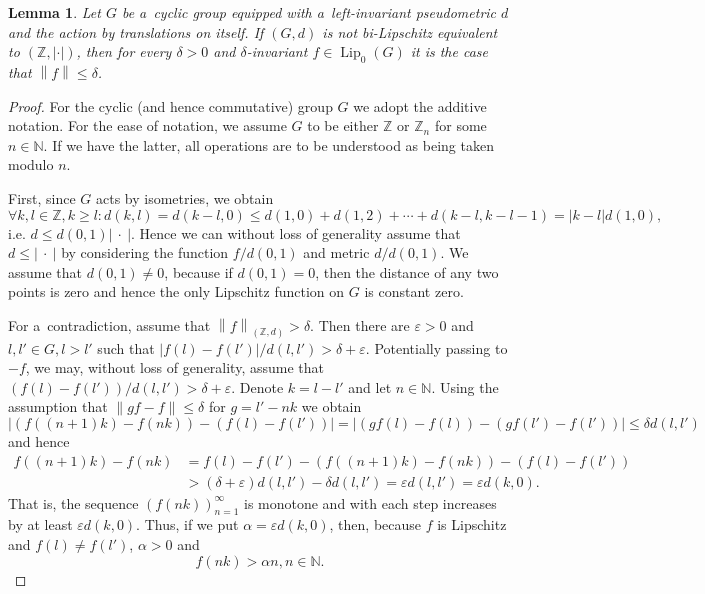 \documentclass[11pt,a4paper]{amsart}
\newtheorem{lemma}[theorem]{Lemma}
\theoremstyle{definition}
\newcommand{\Z}{\mathbb{Z}}
\newcommand{\N}{\mathbb{N}}
\newcommand{\eps}{\varepsilon}
\newcommand{\abs}[1]{\left| #1 \right|}
\newcommand{\norm}[1]{\left\| #1 \right\|}
\newcommand{\Lipz}{\operatorname{Lip}_0}
\newcommand{\absFunc}{\abs{\: \cdot \: }}
\begin{document}
	\begin{lemma} \label{lma:badZ}
		Let $G$ be a~cyclic group equipped with a~left-invariant pseudometric $d$ and the action by translations on itself. If $(G, d)$ is not bi-Lipschitz equivalent to $(\Z, \abs{\cdot})$, then for every $\delta > 0$ and $\delta$-invariant $f \in \Lipz(G)$ it is the case that $\norm{f} \leq \delta$.
	\end{lemma}
	\begin{proof}
		For the cyclic (and hence commutative) group $G$ we adopt the additive notation. For the ease of notation, we assume $G$ to be either $\Z$ or $\Z_n$ for some $n \in \N$. If we have the latter, all operations are to be understood as being taken modulo $n$.
		
		First, since $G$ acts by isometries, we obtain
		\begin{equation*}
			\forall k, l \in \Z, k \geq l \colon d(k, l) = d(k-l, 0) \leq d(1, 0) + d(1, 2) + \cdots + d(k-l, k-l-1) = \abs{k-l}d(1, 0),
		\end{equation*}
		i.e. $d \leq d(0,1)\absFunc$. Hence we can without loss of generality assume that $d \leq \absFunc$ by considering the function $f/d(0,1)$ and metric $d/d(0,1)$. We assume that $d(0, 1) \neq 0$, because if $d(0, 1) = 0$, then the distance of any two points is zero and hence the only Lipschitz function on $G$ is constant zero.
		
		For a~contradiction, assume that $\norm{f}_{(\Z, d)} > \delta$. Then there are $\eps > 0$ and $l, l' \in G, l > l'$ such that $\abs{f(l) - f(l')}/d(l, l') > \delta + \eps$. Potentially passing to $-f$, we may, without loss of generality, assume that $(f(l) - f(l'))/d(l, l') > \delta + \eps$. Denote $k = l - l'$ and let $n \in \N$. Using the assumption that $\norm{gf - f} \leq \delta$ for $g = l' - nk$ we obtain
		\begin{equation*}
			\abs{(f((n+1)k) - f(nk)) - (f(l) - f(l'))}
			= \abs{(gf(l) - f(l)) - (gf(l') - f(l'))}
			\leq \delta d(l, l')
		\end{equation*}
		and hence
		\begin{align*}
			f((n+1)k) - f(nk)
			&= f(l) - f(l') - (f((n+1)k) - f(nk)) - (f(l) - f(l'))\\
			&> (\delta + \eps) d(l, l') - \delta d(l, l')
			= \eps d(l, l')
			= \eps d(k, 0).
		\end{align*}
		That is, the sequence $(f(nk))_{n=1}^\infty$ is monotone and with each step increases by at least $\eps d(k, 0)$. Thus, if we put $\alpha = \eps d(k, 0)$, then, because $f$ is Lipschitz and $f(l) \neq f(l')$, $\alpha > 0$ and 
		\begin{equation} \label{eqn:badZ}
			f(nk) > \alpha n, n \in \N.
		\end{equation}
		

\end{proof}
\end{document}
